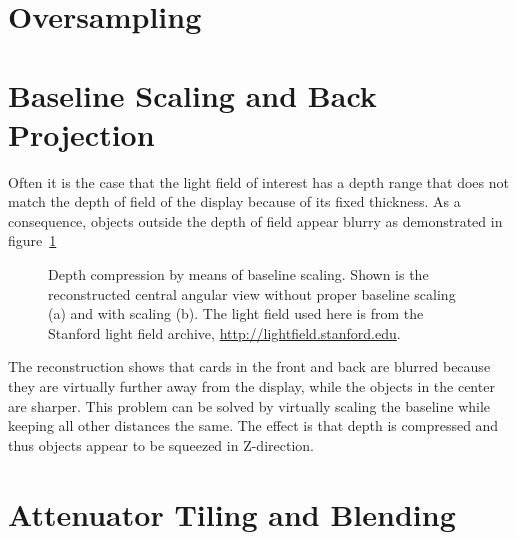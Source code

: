 \section{Oversampling}
\label{sec:oversampling}


\section{Baseline Scaling and Back Projection}
\label{sec:baseline_scaling}

Often it is the case that the light field of interest has a depth range that does not match the depth of field of the display because of its fixed thickness.
As a consequence, objects outside the depth of field appear blurry as demonstrated in figure~\ref{fig:reconstruction_baseline_unscaled}
\begin{figure}[tb]
	\begin{subfigure}{0.5\textwidth}
		\centering
		
		\caption{}
		\label{fig:reconstruction_baseline_unscaled}
	\end{subfigure}%
	\begin{subfigure}{0.5\textwidth}
		\centering
		
		\caption{}
		\label{fig:reconstruction_baseline_scaled_shifted}
	\end{subfigure}
	\caption[Baseline scaling]
			{Depth compression by means of baseline scaling.
			 Shown is the reconstructed central angular view without proper baseline scaling (a) and with scaling (b).
			 The light field used here is from the Stanford light field archive, \mbox{\url{http://lightfield.stanford.edu}}.}
	\label{fig:baseline_scaling}
\end{figure}
The reconstruction shows that cards in the front and back are blurred because they are virtually further away from the display, while the objects in the center are sharper.
This problem can be solved by virtually scaling the baseline while keeping all other distances the same.
The effect is that depth is compressed and thus objects appear to be squeezed in Z-direction.


\section{Attenuator Tiling and Blending}
\label{sec:tiling_and_blending}

